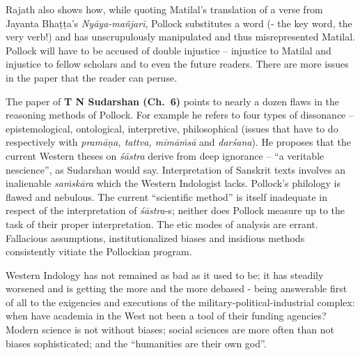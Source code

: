 Rajath also shows how, while quoting Matilal’s translation of a verse from Jayanta Bhaṭṭa’s {\sl Nyāya-mañjarī}, Pollock substitutes a word (- the key word, the very verb!) and has unscrupulously manipulated and thus misrepresented Matilal. Pollock will have to be accused of double injustice -- injustice to Matilal and injustice to fellow scholars and to even the future readers. There are more issues in the paper that the reader can peruse.

The paper of {\bf T N Sudarshan (Ch.~6)} points to nearly a dozen flaws in the reasoning methods of Pollock. For example he refers to four types of dissonance -- epistemological, ontological, interpretive, philosophical (issues that have to do respectively with {\sl pramāṇa, tattva, mīmāṁsā} and {\sl darśana}). He proposes that the current Western theses on {\sl śāstra} derive from deep ignorance -- “a veritable nescience”, as Sudarshan would say. Interpretation of Sanskrit texts involves an inalienable {\sl saṁskāra} which the Western Indologist lacks. Pollock’s philology is flawed and nebulous. The current “scientific method” is itself inadequate in respect of the interpretation of {\sl śāstra}-s; neither does Pollock measure up to the task of their proper interpretation. The etic modes of analysis are errant. Fallacious assumptions, institutionalized biases and insidious methods consistently vitiate the Pollockian program.

Western Indology has not remained as bad as it used to be; it has steadily worsened and is getting the more and the more debased - being answerable first of all to the exigencies and executions of the military-political-industrial complex: when have academia in the West not been a tool of their funding agencies? Modern science is not without biases; social sciences are more often than not biases sophisticated; and the “humanities are their own god”.

